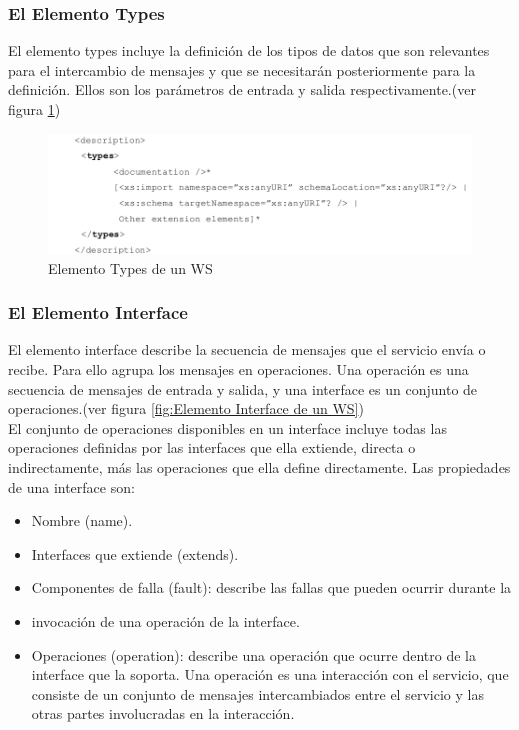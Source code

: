 \subsubsection*{El Elemento Types}

El elemento types incluye la definición de los tipos de datos que son relevantes para el intercambio de mensajes y que se necesitarán posteriormente para la definición. Ellos son los parámetros de entrada y salida respectivamente.(ver figura \ref{fig:Elemento Types de un WS})

\begin{figure}[!h] 
	\begin{center}
		\includegraphics [scale=0.43]{imagenes/elemento_types.png}
	\end{center}
	\caption{Elemento Types de un WS}
	\label{fig:Elemento Types de un WS}
\end{figure} 

\subsubsection*{El Elemento Interface}

El elemento interface describe la secuencia de mensajes que el servicio envía o recibe. Para ello agrupa los mensajes en operaciones. Una operación es una secuencia de mensajes de entrada y salida, y una interface es un conjunto de operaciones.(ver figura \ref{fig:Elemento Interface de un WS})\\
El conjunto de operaciones disponibles en un interface incluye todas las operaciones definidas por las interfaces que ella extiende, directa o indirectamente, más las operaciones que ella define directamente. Las propiedades de una interface son:\\

\begin{itemize}
	\item Nombre (name).
	\item Interfaces que extiende (extends).
	\item Componentes de falla (fault): describe las fallas que pueden ocurrir durante la \item invocación de una operación de la interface.
	\item Operaciones (operation): describe una operación que ocurre dentro de la interface que la soporta. Una operación es una interacción con el servicio, que consiste de un conjunto de mensajes intercambiados entre el servicio y las otras partes involucradas en la interacción.
\end{itemize}

